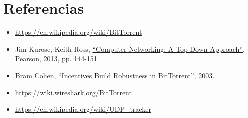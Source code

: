 \documentclass{article}
\begin{document}
\section{Referencias}
\begin{itemize}
\item \href{https://en.wikipedia.org/wiki/BitTorrent}{https://en.wikipedia.org/wiki/BitTorrent}
\item Jim Kurose, Keith Ross, \href{https://www.bau.edu.jo/UserPortal/UserProfile/PostsAttach/10617_1870_1.pdf}{``Computer Networking: A Top-Down Approach''}, Pearson, 2013, pp. 144-151.
\item Bram Cohen, \href{http://bittorrent.org/bittorrentecon.pdf}{``Incentives Build Robustness in BitTorrent''}, 2003.
\item \href{https://wiki.wireshark.org/BitTorrent}{https://wiki.wireshark.org/BitTorrent}
\item \href{https://en.wikipedia.org/wiki/UDP_tracker}{https://en.wikipedia.org/wiki/UDP\_tracker}
\end{itemize}    
\end{document}
